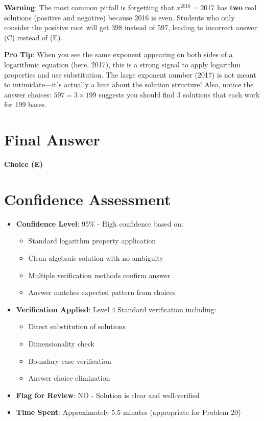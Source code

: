 \documentclass[]{article}
\begin{document}
\begin{warningbox}
\textbf{Warning}: The most common pitfall is forgetting that $x^{2016} = 2017$ has \textbf{two} real solutions (positive and negative) because 2016 is even. Students who only consider the positive root will get 398 instead of 597, leading to incorrect answer (C) instead of (E).
\end{warningbox}

\begin{tipbox}
\textbf{Pro Tip}: When you see the same exponent appearing on both sides of a logarithmic equation (here, 2017), this is a strong signal to apply logarithm properties and use substitution. The large exponent number (2017) is not meant to intimidate—it's actually a hint about the solution structure! Also, notice the answer choices: $597 = 3 \times 199$ suggests you should find 3 solutions that each work for 199 bases.
\end{tipbox}

\section*{Final Answer}
 \quad \textbf{Choice (E)}

\section*{Confidence Assessment}
\begin{itemize}[leftmargin=*]
    \item \textbf{Confidence Level}: 95\% - High confidence based on:
    \begin{itemize}
        \item Standard logarithm property application
        \item Clean algebraic solution with no ambiguity
        \item Multiple verification methods confirm answer
        \item Answer matches expected pattern from choices
    \end{itemize}
    
    \item \textbf{Verification Applied}: Level 4 Standard verification including:
    \begin{itemize}
        \item Direct substitution of solutions
        \item Dimensionality check
        \item Boundary case verification
        \item Answer choice elimination
    \end{itemize}
    
    \item \textbf{Flag for Review}: NO - Solution is clear and well-verified
    
    \item \textbf{Time Spent}: Approximately 5.5 minutes (appropriate for Problem 20)
\end{itemize}
\end{document}
